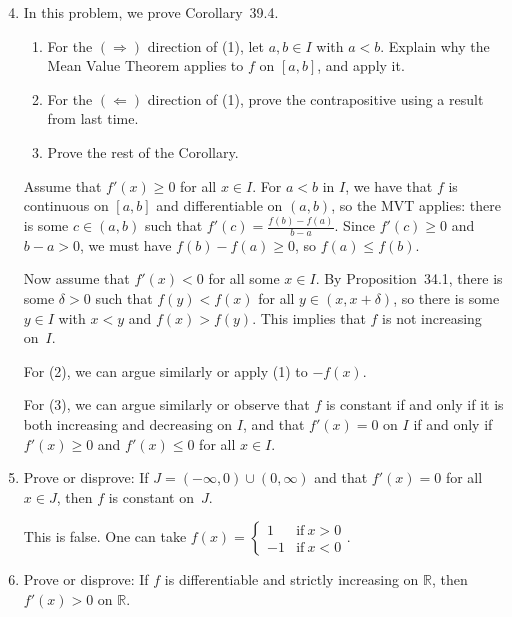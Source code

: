 \documentclass[12pt]{amsart}
\def\d{\delta}
\newcommand{\R}{{\mathbb{R}}}
\numberwithin{equation}{section}
\theoremstyle{plain} %
\theoremstyle{definition}
\theoremstyle{remark}
\begin{document}
\begin{enumerate}
\setcounter{enumi}{3}
\item In this problem, we prove Corollary~39.4.
\begin{enumerate}
\item For the $(\Rightarrow)$ direction of (1), let $a,b\in I$ with $a<b$. Explain why the Mean Value Theorem applies to $f$ on $[a,b]$, and apply it.
\item For the $(\Leftarrow)$ direction of (1), prove the contrapositive using a result from last time.
\item Prove the rest of the Corollary.
\end{enumerate}

\begin{framed}
Assume that $f'(x) \geq 0$ for all $x\in I$. For $a<b$ in $I$, we have that $f$ is continuous on $[a,b]$ and differentiable on $(a,b)$, so the MVT applies: there is some $c\in (a,b)$ such that $f'(c) = \frac{f(b)-f(a)}{b-a}$. Since $f'(c) \geq 0$ and $b-a>0$, we must have $f(b)-f(a)\geq 0$, so $f(a) \leq f(b)$.

Now assume that $f'(x) < 0$ for all some $x\in I$. By Proposition~34.1, there is some $\delta>0$ such that $f(y) < f(x)$ for all $y\in (x,x+\d)$, so there is some $y\in I$ with $x<y$ and $f(x) > f(y)$. This implies that $f$ is not increasing on~$I$.

For (2), we can argue similarly or apply (1) to $-f(x)$.

For (3), we can argue similarly or observe that $f$ is constant if and only if it is both increasing and decreasing on $I$, and that $f'(x) = 0$ on $I$ if and only if $f'(x)\geq 0$ and $f'(x)\leq 0$ for all $x\in I$.
\end{framed}


\item Prove or disprove: If $J= (-\infty,0) \cup (0,\infty)$ and that $f'(x) = 0$ for all $x\in J$, then $f$ is constant on~$J$.

\begin{framed}
This is false. One can take $f(x)=\begin{cases} 1 & \text{if} \ x>0 \\ -1 & \text{if} \ x<0 \end{cases}$.
\end{framed}

\item Prove or disprove: If $f$ is differentiable and strictly increasing on $\R$, then ${f'(x)>0}$ on $\R$.


\end{enumerate}
\end{document}
